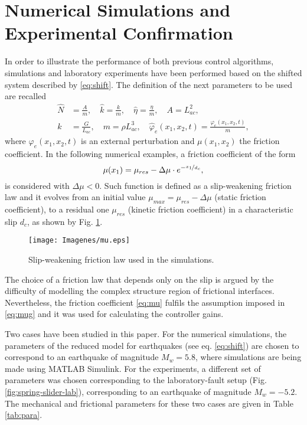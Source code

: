\documentclass[journal,twoside,web]{ieeecolor}
\begin{document}
\section{Numerical Simulations and Experimental Confirmation}
\label{sec:SimExp}

In order to illustrate the performance of both previous control algorithms, simulations and laboratory experiments have been performed based on the shifted system described by \eqref{eq:shift}. The definition of the next parameters to be used are recalled
\begin{equation*}
\begin{split}
  \hat{N}&=\frac{A}{m}, \quad \hat{k}=\frac{k}{m}, \quad \hat{\eta}=\frac{\eta}{m}, \quad A=L_{ac}^2, \\
  k &= \frac{G}{L_{ac}}, \quad m = \rho L_{ac}^3, \quad \hat{\varphi}_e(x_1,x_2,t)=\frac{\varphi_e(x_1,x_2,t)}{m},
\end{split}
\end{equation*}
where $\varphi_e(x_1,x_2,t)$ is an external perturbation and $\mu(x_1,x_2)$ the friction coefficient. In the following numerical examples, a friction coefficient of the form 
\begin{equation}
  \mu(x_1)=\mu_{res}-\Delta \mu \cdot e^{-\nicefrac{x_1}{d_c}},
  \label{eq:mu}
\end{equation}
is considered with $\Delta \mu<0$. Such function is defined as a slip-weakening friction law \cite{b:Kanamori-Brodsky-2004} and it evolves from an initial value $\mu_{max}=\mu_{res}-\Delta \mu$ (static friction coefficient), to a residual one $\mu_{res}$ (kinetic friction coefficient) in a characteristic slip $d_c$, as shown by Fig. \ref{fig:mu}.
\begin{figure}[ht!]
  \centering 
  \texttt{[image: Imagenes/mu.eps]}
  \caption{Slip-weakening friction law used in the simulations.}
  \label{fig:mu}
\end{figure}

The choice of a friction law that depends only on the slip is argued by the difficulty of modelling the complex structure region of frictional interfaces. Nevertheless, the friction coefficient \eqref{eq:mu} fulfils the assumption imposed in \eqref{eq:mug} and it was used for calculating the controller gains.

Two cases have been studied in this paper. For the numerical simulations, the parameters of the reduced model for earthquakes (see eq. \eqref{eq:shift}) are chosen to correspond to an earthquake of magnitude $M_w=5.8$, where simulations are being made using MATLAB Simulink. For the experiments, a different set of parameters was chosen corresponding to the laboratory-fault setup (Fig. \ref{fig:spring-slider-lab}), corresponding to an earthquake of magnitude $M_w=-5.2$. The mechanical and frictional parameters for these two cases are given in Table \ref{tab:para}.
 
\end{document}

